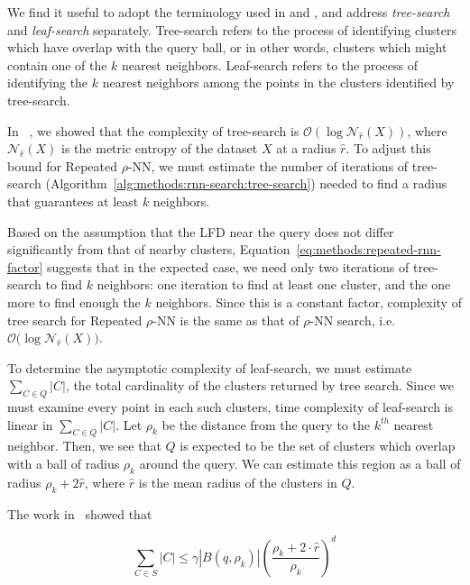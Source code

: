 We find it useful to adopt the terminology used in \cite{ishaq2019clustered} and \cite{yu2015entropy}, and address \textit{tree-search} and \textit{leaf-search} separately.
Tree-search refers to the process of identifying clusters which have overlap with the query ball, or in other words, clusters which might contain one of the $k$ nearest neighbors. 
Leaf-search refers to the process of identifying the $k$ nearest neighbors among the points in the clusters identified by tree-search.

In ~\cite{ishaq2019clustered}, we showed that the complexity of tree-search is $\mathcal{O}(\log\mathcal{N}_{\hat{r}}(X))$, where $\mathcal{N}_{\hat{r}}(X)$ is the metric entropy of the dataset $X$ at a radius $\hat{r}$.
To adjust this bound for Repeated $\rho$-NN, we must estimate the number of iterations of tree-search (Algorithm~\ref{alg:methods:rnn-search:tree-search}) needed to find a radius that guarantees at least $k$ neighbors.

Based on the assumption that the LFD near the query does not differ significantly from that of nearby clusters, Equation~\ref{eq:methods:repeated-rnn-factor} suggests that in the expected case, we need only two iterations of tree-search to find $k$ neighbors:
one iteration to find at least one cluster, and the one more to find enough the $k$ neighbors.
Since this is a constant factor, complexity of tree search for Repeated $\rho$-NN is the same as that of $\rho$-NN search, i.e. $\mathcal{O}\big(\log\mathcal{N}_{\hat{r}}(X)\big)$.

To determine the asymptotic complexity of leaf-search, we must estimate $\sum_{C \in Q} |C|$, the total cardinality of the clusters returned by tree search.
Since we must examine every point in each such clusters, time complexity of leaf-search is linear in $\sum_{C \in Q} |C|$. 
Let $\rho_k$ be the distance from the query to the $k^{th}$ nearest neighbor.
Then, we see that $Q$ is expected to be the set of clusters which overlap with a ball of radius $\rho_k$ around the query.
We can estimate this region as a ball of radius $\rho_k + 2\hat{r}$, where $\hat{r}$ is the mean radius of the clusters in $Q$.

The work in~\cite{yu2015entropy} showed that

\begin{equation*}
    \sum_{C \in S} |C| \leq \gamma  \left| B(q, \rho_k) \right| \left(\frac{\rho_k + 2 \cdot \hat{r}}{\rho_k} \right)^d
\end{equation*}

